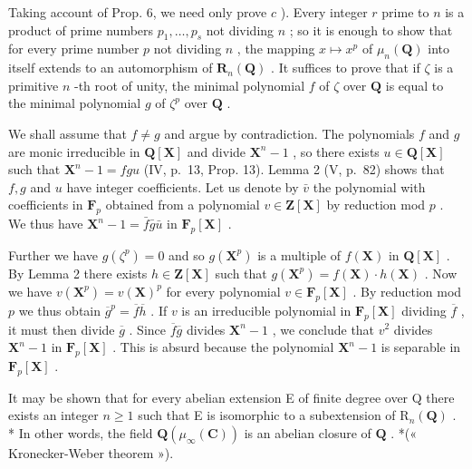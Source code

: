 Taking account of Prop. 6, we need only prove \(c\) ). Every integer \(r\) prime to \(n\) is a product of prime numbers \(p_1, \ldots, p_s\) not dividing \(n\) ; so it is enough to show that for every prime number \(p\) not dividing \(n\) , the mapping \(x \mapsto x^p\) of \(\mu_n(\mathbf{Q})\) into itself extends to an automorphism of \(\mathbf{R}_n(\mathbf{Q})\) . It suffices to prove that if \(\zeta\) is a primitive \(n\) -th root of unity, the minimal polynomial \(f\) of \(\zeta\) over \(\mathbf{Q}\) is equal to the minimal polynomial \(g\) of \(\zeta^p\) over \(\mathbf{Q}\) .

We shall assume that \(f \neq g\) and argue by contradiction. The polynomials \(f\) and \(g\) are monic irreducible in \(\mathbf{Q}[\mathbf{X}]\) and divide \(\mathbf{X}^n - 1\) , so there exists \(u \in \mathbf{Q}[\mathbf{X}]\) such that \(\mathbf{X}^n - 1 = fgu\) (IV, p.~13, Prop. 13). Lemma 2 (V, p.~82) shows that \(f, g\) and \(u\) have integer coefficients. Let us denote by \(\bar{v}\) the polynomial with coefficients in \(\mathbf{F}_p\) obtained from a polynomial \(v \in \mathbf{Z}[\mathbf{X}]\) by reduction mod \(p\) . We thus have \(\mathbf{X}^n - 1 = \bar{f}\bar{g}\bar{u}\) in \(\mathbf{F}_p[\mathbf{X}]\) .

Further we have \(g(\zeta^p) = 0\) and so \(g(\mathbf{X}^p)\) is a multiple of \(f(\mathbf{X})\) in \(\mathbf{Q}[\mathbf{X}]\) . By Lemma 2 there exists \(h \in \mathbf{Z}[\mathbf{X}]\) such that \(g(\mathbf{X}^p) = f(\mathbf{X}) \cdot h(\mathbf{X})\) . Now we have \(v(\mathbf{X}^p) = v(\mathbf{X})^p\) for every polynomial \(v \in \mathbf{F}_p[\mathbf{X}]\) . By reduction mod \(p\) we thus obtain \(\overline{g}^p = \overline{f}\overline{h}\) . If \(v\) is an irreducible polynomial in \(\mathbf{F}_p[\mathbf{X}]\) dividing \(\overline{f}\) , it must then divide \(\overline{g}\) . Since \(\overline{f}\overline{g}\) divides \(\mathbf{X}^n - 1\) , we conclude that \(v^2\) divides \(\mathbf{X}^n - 1\) in \(\mathbf{F}_p[\mathbf{X}]\) . This is absurd because the polynomial \(\mathbf{X}^n - 1\) is separable in \(\mathbf{F}_p[\mathbf{X}]\) .

It may be shown that for every abelian extension E of finite degree over Q there exists an integer \(n \geqslant 1\) such that E is isomorphic to a subextension of \(\mathrm{R}_{n}(\mathbf{Q})\) . * In other words, the field \(\mathbf{Q}(\mu_{\infty}(\mathbf{C}))\) is an abelian closure of \(\mathbf{Q}\) . *(« Kronecker-Weber theorem »).

